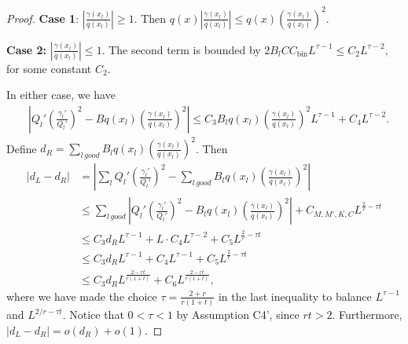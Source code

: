 \documentclass{article}
\newcommand{\bin}{\text{bin}}
\begin{document}
\begin{proof}
\textbf{Case 1}: $\left|\frac{\gamma(x_l)}{q(x_l)}\right| \geq 1$. Then 
$q(x) \left| \frac{\gamma(x_l)}{q(x_l)} \right| 
  \leq q(x) \left( \frac{\gamma(x_l)}{q(x_l)} \right)^2 $.

\textbf{Case 2:} $\left| \frac{\gamma(x_l)}{q(x_l)} \right| \leq 1$. The second term is bounded by $2 B_l CC_\bin L^{\tau - 1 } \leq C_2 L^{\tau - 2}$, for some constant $C_2$.

In either case, we have
\begin{align*}
& \left| Q_l' \left( \frac{\gamma_l'}{Q_l'} \right)^2 
         - B q(x_l) \left( \frac{\gamma(x_l)}{q(x_l)} \right)^2 \right| 
  \leq C_3 B_l q(x_l) \left( \frac{\gamma(x_l)}{q(x_l)} \right)^2  L^{\tau - 1} +
        C_4 L^{\tau - 2}.
\end{align*}
Define $d_R = \sum_{l \, good} B_l q(x_l) \left( \frac{\gamma(x_l)}{q(x_l)} \right)^2$. Then
\begin{align*}
  |d_L - d_R| &= \left| \sum_l Q_l' \left( \frac{\gamma_l'}{Q_l'} \right)^2 - \sum_{l \, good} B_l q(x_l) \left( \frac{\gamma(x_l)}{q(x_l)} \right)^2 \right| \\
  &\leq \sum_{l \, good} \left| Q_l' \left( \frac{\gamma_l'}{Q_l'} \right)^2 - B_l q(x_l) \left( \frac{\gamma(x_l)}{q(x_l)} \right)^2 \right| + C_{M, M', K, C} L^{\frac{2}{r} - \tau t} \\
  &\leq C_3 d_R L^{\tau - 1}
       + L \cdot C_4 L^{\tau - 2}  + C_5 L^{\frac{2}{r} - \tau t} \\
  &\leq  C_3 d_R L^{\tau - 1} 
       +   C_4 L^{\tau - 1}  + C_{5} L^{\frac{2}{r} - \tau t} \\
 &\leq C_3 d_R L^{\frac{2 - rt}{r(1+t)}} 
       +   C_{6} L^{\frac{2 - rt}{r(1+t)} },
\end{align*}
where we have made the choice $\tau= \frac{2 + r}{r(1+t)}$ in the last inequality to balance $L^{\tau - 1}$ and $L^{2/r - \tau t}$. Notice that $0 < \tau < 1$ by Assumption C4', since $rt > 2$. Furthermore, $|d_L - d_R| = o(d_R) + o(1)$.


\end{proof}
\end{document}
